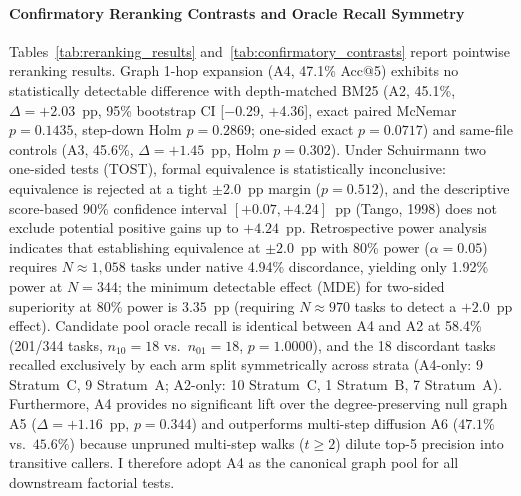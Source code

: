 \documentclass[10pt]{article}
\begin{document}
\paragraph{Confirmatory Reranking Contrasts and Oracle Recall Symmetry}
Tables~\ref{tab:reranking_results} and~\ref{tab:confirmatory_contrasts} report pointwise reranking results. Graph 1-hop expansion (A4, 47.1\% Acc@5) exhibits no statistically detectable difference with depth-matched BM25 (A2, 45.1\%, $\Delta = +2.03$~pp, 95\% bootstrap CI [$-$0.29, +4.36], exact paired McNemar $p=0.1435$, step-down Holm $p=0.2869$; one-sided exact $p=0.0717$) and same-file controls (A3, 45.6\%, $\Delta = +1.45$~pp, Holm $p=0.302$). Under Schuirmann two one-sided tests (TOST), formal equivalence is statistically inconclusive: equivalence is rejected at a tight $\pm 2.0$~pp margin ($p = 0.512$), and the descriptive score-based 90\% confidence interval $[+0.07, +4.24]$~pp (Tango, 1998) does not exclude potential positive gains up to $+4.24$~pp. Retrospective power analysis indicates that establishing equivalence at $\pm 2.0$~pp with 80\% power ($\alpha=0.05$) requires $N \approx 1{,}058$ tasks under native 4.94\% discordance, yielding only 1.92\% power at $N=344$; the minimum detectable effect (MDE) for two-sided superiority at 80\% power is $3.35$~pp (requiring $N \approx 970$ tasks to detect a $+2.0$~pp effect). Candidate pool oracle recall is identical between A4 and A2 at 58.4\% (201/344 tasks, $n_{10}=18$ vs.\ $n_{01}=18$, $p=1.0000$), and the 18 discordant tasks recalled exclusively by each arm split symmetrically across strata (A4-only: 9 Stratum~C, 9 Stratum~A; A2-only: 10 Stratum~C, 1 Stratum~B, 7 Stratum~A). Furthermore, A4 provides no significant lift over the degree-preserving null graph A5 ($\Delta = +1.16$~pp, $p=0.344$) and outperforms multi-step diffusion A6 ($47.1\%$ vs.\ $45.6\%$) because unpruned multi-step walks ($t \ge 2$) dilute top-5 precision into transitive callers. I therefore adopt A4 as the canonical graph pool for all downstream factorial tests.
\end{document}
